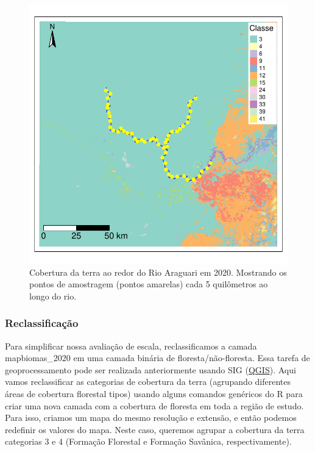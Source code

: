 \documentclass[
]{article}
\begin{document}
\begin{figure}
\centering
\includegraphics{epr_files/figure-latex/unnamed-chunk-15-1.pdf}
\caption{\label{fig:unnamed-chunk-15} Cobertura da terra ao redor do Rio Araguari em 2020. Mostrando os pontos de amostragem (pontos amarelas) cada 5 quilômetros ao longo do rio.}
\end{figure}

\newpage

\hypertarget{reclassificauxe7uxe3o}{%
\subsubsection{Reclassificação}\label{reclassificauxe7uxe3o}}

Para simplificar nossa avaliação de escala, reclassificamos a camada mapbiomas\_2020 em uma camada binária de floresta/não-floresta. Essa tarefa de geoprocessamento pode ser realizada anteriormente usando SIG (\href{https://docs.qgis.org/3.22/pt_BR/docs/training_manual/rasters/terrain_analysis.html\#moderate-fa-reclassifying-the-raster}{QGIS}). Aqui vamos reclassificar as categorias de cobertura da terra (agrupando diferentes áreas de cobertura florestal tipos) usando alguns comandos genéricos do R para criar uma nova camada com a cobertura de floresta em toda a região de estudo. Para isso, criamos um mapa do mesmo resolução e extensão, e então podemos redefinir os valores do mapa. Neste caso, queremos agrupar a cobertura da terra categorias 3 e 4 (Formação Florestal e Formação Savânica, respectivamente).
\end{document}
